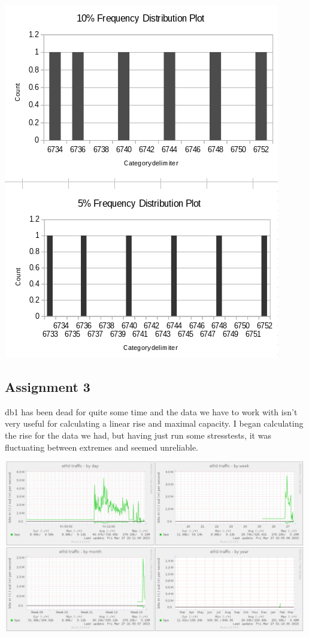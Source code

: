\includegraphics[scale=0.6]{graph.png}
\newpage
\subsection{Assignment 3}
db1 has been dead for quite some time and the data we have to work with isn't very useful for calculating a linear rise and maximal capacity. I began calculating the rise for the data we had, but having just run some stresstests, it was fluctuating between extremes and seemed unreliable.

\includegraphics[scale=0.4]{munin.png}